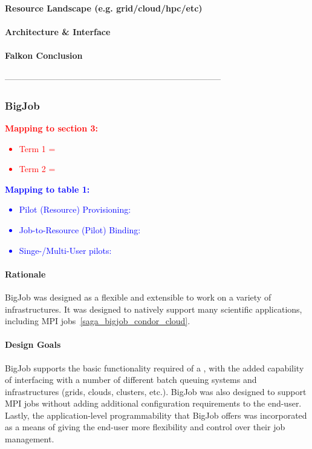 \documentclass{sig-alternate}
\begin{document}
\paragraph{Resource Landscape (e.g. grid/cloud/hpc/etc)}


\paragraph{Architecture \& Interface}


\paragraph{Falkon Conclusion}



 -----------------------------------------------------------------------------

\subsubsection{BigJob}


\textcolor{red}
{
\textbf{Mapping to section 3:}
\begin{itemize}
\item Term 1 =
\item Term 2 =
\end{itemize}
}

\textcolor{blue}
{
\textbf{Mapping to table 1:}
\begin{itemize}
\item Pilot (Resource) Provisioning:
\item Job-to-Resource (Pilot) Binding:
\item Singe-/Multi-User pilots:
\end{itemize}
}

\paragraph{Rationale}
BigJob was designed as a flexible and extensible \pilotjob
to work on a variety of infrastructures. It was designed to
natively support many scientific applications, including
MPI jobs~\ref{saga_bigjob_condor_cloud}.

\paragraph{Design Goals}
BigJob supports the basic functionality required of a \pilotjob,
with the added capability of interfacing with a number of
different batch queuing systems and infrastructures (grids,
clouds, clusters, etc.). BigJob was also designed to
support MPI jobs without adding additional configuration
requirements to the end-user. Lastly, the application-level
programmability that BigJob offers was incorporated as a
means of giving the end-user more flexibility and control
over their job management.
\end{document}
